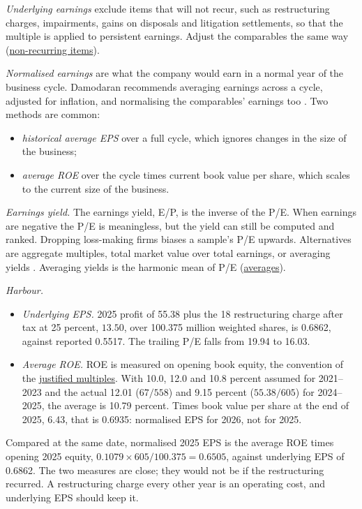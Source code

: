 \begin{qfmethod}\label{meth:normalised-earnings}
 \emph{Underlying earnings} exclude items that will not recur, such as restructuring charges, impairments, gains on disposals and litigation settlements, so that the multiple is applied to persistent earnings. Adjust the comparables the same way (\hyperref[meth:non-recurring-items]{non-recurring items}).

\emph{Normalised earnings} are what the company would earn in a normal year of the business cycle. Damodaran recommends averaging earnings across a cycle, adjusted for inflation, and normalising the comparables' earnings too \citep[p.~487]{investment-valuation-2012}. Two methods are common:
\begin{itemize}
\item \emph{historical average EPS} over a full cycle, which ignores changes in the size of the business;
\item \emph{average ROE} over the cycle times current book value per share, which scales to the current size of the business.
\end{itemize}

\emph{Earnings yield.} The earnings yield, E/P, is the inverse of the P/E. When earnings are negative the P/E is meaningless, but the yield can still be computed and ranked. Dropping loss-making firms biases a sample's P/E upwards. Alternatives are aggregate multiples, total market value over total earnings, or averaging yields \citep[pp.~458--459]{investment-valuation-2012}. Averaging yields is the harmonic mean of P/E (\hyperref[meth:comparables-evaluation]{averages}).

 \emph{Harbour.}
\begin{itemize}
\item \emph{Underlying EPS.} 2025 profit of 55.38 plus the 18 restructuring charge after tax at 25 percent, $13.50$, over 100.375 million weighted shares, is 0.6862, against reported 0.5517. The trailing P/E falls from 19.94 to 16.03.
\item \emph{Average ROE.} ROE is measured on opening book equity, the convention of the \hyperref[meth:justified-multiples]{justified multiples}. With 10.0, 12.0 and 10.8 percent assumed for 2021--2023 and the actual 12.01 ($67/558$) and 9.15 percent ($55.38/605$) for 2024--2025, the average is 10.79 percent. Times book value per share at the end of 2025, 6.43, that is 0.6935: normalised EPS for 2026, not for 2025.
\end{itemize}
Compared at the same date, normalised 2025 EPS is the average ROE times opening 2025 equity, $0.1079\times605/100.375=0.6505$, against underlying EPS of 0.6862. The two measures are close; they would not be if the restructuring recurred. A restructuring charge every other year is an operating cost, and underlying EPS should keep it.


\end{qfmethod}
